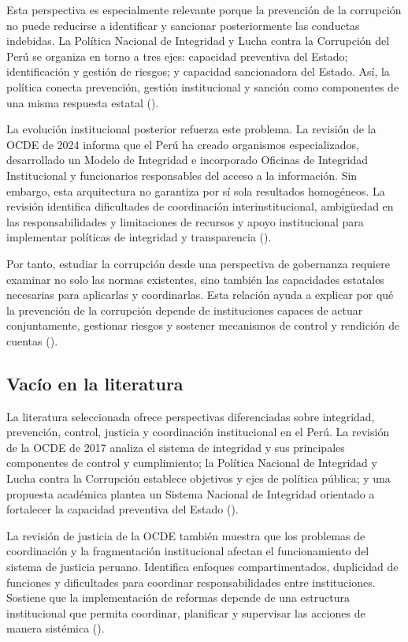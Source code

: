 \documentclass[Afour,sageh,times]{sagej}
\begin{document}
Esta perspectiva es especialmente relevante porque la prevención de la corrupción no puede reducirse a identificar y sancionar posteriormente las conductas indebidas. La Política Nacional de Integridad y Lucha contra la Corrupción del Perú se organiza en torno a tres ejes: capacidad preventiva del Estado; identificación y gestión de riesgos; y capacidad sancionadora del Estado. Así, la política conecta prevención, gestión institucional y sanción como componentes de una misma respuesta estatal (\citealp{pcm2017politica}).

La evolución institucional posterior refuerza este problema. La revisión de la OCDE de 2024 informa que el Perú ha creado organismos especializados, desarrollado un Modelo de Integridad e incorporado Oficinas de Integridad Institucional y funcionarios responsables del acceso a la información. Sin embargo, esta arquitectura no garantiza por sí sola resultados homogéneos. La revisión identifica dificultades de coordinación interinstitucional, ambigüedad en las responsabilidades y limitaciones de recursos y apoyo institucional para implementar políticas de integridad y transparencia (\citealp{oecd2024sistema}).

Por tanto, estudiar la corrupción desde una perspectiva de gobernanza requiere examinar no solo las normas existentes, sino también las capacidades estatales necesarias para aplicarlas y coordinarlas. Esta relación ayuda a explicar por qué la prevención de la corrupción depende de instituciones capaces de actuar conjuntamente, gestionar riesgos y sostener mecanismos de control y rendición de cuentas (\citealp{oecd2017integrity,oecd2024sistema}).

\subsection{Vacío en la literatura}
La literatura seleccionada ofrece perspectivas diferenciadas sobre integridad, prevención, control, justicia y coordinación institucional en el Perú. La revisión de la OCDE de 2017 analiza el sistema de integridad y sus principales componentes de control y cumplimiento; la Política Nacional de Integridad y Lucha contra la Corrupción establece objetivos y ejes de política pública; y una propuesta académica plantea un Sistema Nacional de Integridad orientado a fortalecer la capacidad preventiva del Estado (\citealp{oecd2017integrity,pcm2017politica,munive2022integridad}).

La revisión de justicia de la OCDE también muestra que los problemas de coordinación y la fragmentación institucional afectan el funcionamiento del sistema de justicia peruano. Identifica enfoques compartimentados, duplicidad de funciones y dificultades para coordinar responsabilidades entre instituciones. Sostiene que la implementación de reformas depende de una estructura institucional que permita coordinar, planificar y supervisar las acciones de manera sistémica (\citealp{oecd2024justice}).
\end{document}
